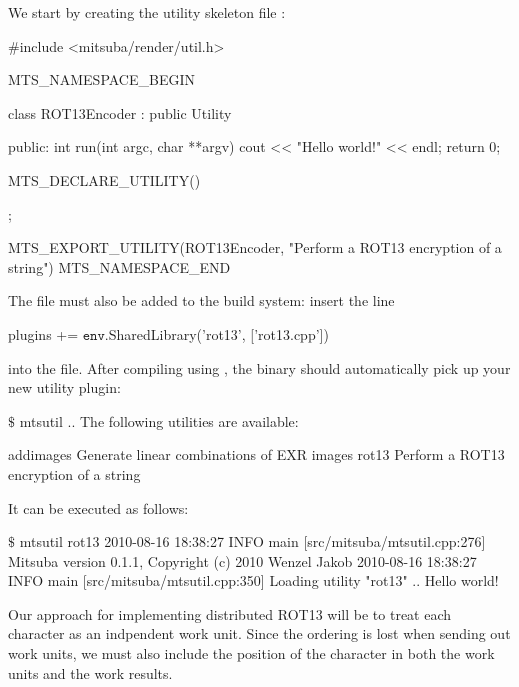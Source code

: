 We start by creating the utility skeleton file :
\begin{cpp}
#include <mitsuba/render/util.h>

MTS_NAMESPACE_BEGIN

class ROT13Encoder : public Utility {
public:
	int run(int argc, char **argv) {
		cout << "Hello world!" << endl;
		return 0;
	}

	MTS_DECLARE_UTILITY()
};

MTS_EXPORT_UTILITY(ROT13Encoder, "Perform a ROT13 encryption of a string")
MTS_NAMESPACE_END
\end{cpp}
The file must also be added to the build system: insert the line
\begin{shell}
plugins += $\texttt{env}$.SharedLibrary('rot13', ['rot13.cpp'])
\end{shell}
into the  file. After compiling
using , the  binary should automatically pick up your new utility plugin:
\begin{shell}
$\texttt{\$}$ mtsutil
..
The following utilities are available:

	addimages             Generate linear combinations of EXR images
	rot13                 Perform a ROT13 encryption of a string
\end{shell}
It can be executed as follows:
\begin{shell}
$\texttt{\$}$ mtsutil rot13
2010-08-16 18:38:27 INFO  main [src/mitsuba/mtsutil.cpp:276] Mitsuba version 0.1.1, Copyright (c) 2010 Wenzel Jakob
2010-08-16 18:38:27 INFO  main [src/mitsuba/mtsutil.cpp:350] Loading utility "rot13" ..
Hello world!
\end{shell}

Our approach for implementing distributed ROT13 will be to treat each character as an
indpendent work unit. Since the ordering is lost when sending out work units, we must
also include the position of the character in both the work units and the work results.


